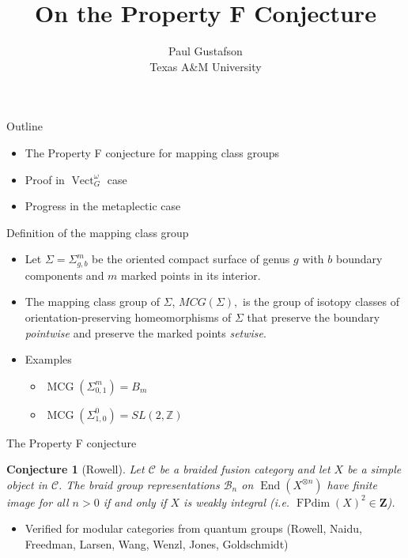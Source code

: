 \documentclass{beamer}
\title{On the Property F Conjecture}
\date{Paul Gustafson \\ Texas A\&M University}
\DeclareMathOperator{\FPdim}{FPdim}
\DeclareMathOperator{\End}{End}
\DeclareMathOperator{\MCG}{MCG}
\DeclareMathOperator{\Vect}{Vect}
\newtheorem{conj}[theorem]{Conjecture}
\begin{document}
\frame{\titlepage}

\begin{frame}{Outline}
  \begin{itemize}
  \item The Property F conjecture for mapping class groups
  \item Proof in $\Vect_G^\omega$ case
  \item Progress in the metaplectic case
  \end{itemize}
\end{frame}


\begin{frame}{Definition of the mapping class group}
\begin{itemize}
\item
    Let $\Sigma = \Sigma_{g,b}^m$ be the oriented compact surface of genus $g$ with $b$ boundary components and $m$ marked points in its interior.

    \pause
\item
   The mapping class group of $\Sigma$, 
   $MCG(\Sigma),$
   is the group of isotopy classes of orientation-preserving homeomorphisms of $\Sigma$ that preserve the boundary \emph{pointwise} and preserve the marked points \emph{setwise}.

  \item Examples
  \begin{itemize}
    \item $\MCG(\Sigma_{0,1}^m) = B_m$
    \item $\MCG(\Sigma_{1,0}^0) = SL(2,\mathbb Z)$
  \end{itemize}
\end{itemize}
\end{frame}


\begin{frame}{The Property F conjecture}
\begin{conj}[Rowell]
Let $\mathcal C$ be a braided fusion category and let $X$ be a simple object in $\mathcal C$.  The braid group representations $\mathcal B_n$ on $\End(X^{\otimes n})$ have finite image for all $n>0$ if and only if  $X$ is weakly integral (i.e. $\FPdim(X)^2 \in \mathbf Z$).
\end{conj}

\begin{itemize}
\item Verified for modular categories from quantum groups (Rowell, Naidu, Freedman, Larsen, Wang, Wenzl, Jones, Goldschmidt)
\end{itemize}
\end{frame}
\end{document}
